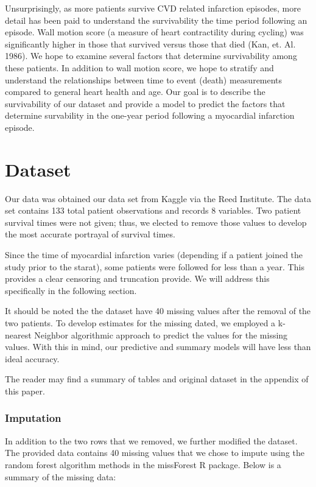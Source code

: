 \documentclass[
]{article}
\begin{document}
Unsurprisingly, as more patients survive CVD related infarction
episodes, more detail has been paid to understand the survivability the
time period following an episode. Wall motion score (a measure of heart
contractility during cycling) was significantly higher in those that
survived versus those that died (Kan, et. Al. 1986). We hope to examine
several factors that determine survivability among these patients. In
addition to wall motion score, we hope to stratify and understand the
relationships between time to event (death) measurements compared to
general heart health and age. Our goal is to describe the survivability
of our dataset and provide a model to predict the factors that determine
survability in the one-year period following a myocardial infarction
episode.

\hypertarget{dataset}{%
\section{Dataset}\label{dataset}}

Our data was obtained our data set from Kaggle via the Reed Institute.
The data set contains 133 total patient observations and records 8
variables. Two patient survival times were not given; thus, we elected
to remove those values to develop the most accurate portrayal of
survival times.

Since the time of myocardial infarction varies (depending if a patient
joined the study prior to the starat), some patients were followed for
less than a year. This provides a clear censoring and truncation
provide. We will address this specifically in the following section.

It should be noted the the dataset have 40 missing values after the
removal of the two patients. To develop estimates for the missing dated,
we employed a k-nearest Neighbor algorithmic approach to predict the
values for the missing values. With this in mind, our predictive and
summary models will have less than ideal accuracy.

The reader may find a summary of tables and original dataset in the
appendix of this paper.

\hypertarget{imputation}{%
\subsubsection{Imputation}\label{imputation}}

In addition to the two rows that we removed, we further modified the
dataset. The provided data contains 40 missing values that we chose to
impute using the random forest algorithm methods in the missForest R
package. Below is a summary of the missing data:
\end{document}
